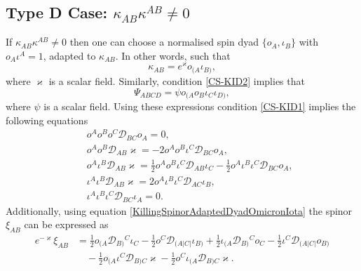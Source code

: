\documentclass[10pt,a4paper]{article}
\theoremstyle{plain}
\begin{document}
\subsection{Type D Case: $\kappa_{AB}\kappa^{AB}\neq 0$}
\label{TypeD}

If  $\kappa_{AB}\kappa^{AB}\neq 0$  then one can choose a normalised spin dyad $\{o_{A},\iota_{B}\}$
with $o_{A}\iota^{A}=1$, adapted to $\kappa_{AB}$. In other words, such that
\begin{equation} \label{KillingSpinorAdaptedDyadOmicronIota}
\kappa_{AB}=e^\varkappa o_{(A}\iota_{B)},
\end{equation}
where $\varkappa$ is a scalar field.
Similarly, condition \eqref{CS-KID2} implies that
\begin{equation}\label{WeylAdaptedDyadOmicronIota}
\Psi_{ABCD}=\psi o_{(A}o_{B}\iota_{C}\iota_{D)},
\end{equation}
where $\psi$ is a scalar field.  Using these expressions condition
\eqref{CS-KID1} implies the following equations
\begin{subequations}
\begin{eqnarray}
&& o^{A} o^{B} o^{C} \mathcal{D}_{BC}o_{A} = 0, \label{EqA1a} \\ &&
  o^{A} o^{B} \mathcal{D}_{AB}\varkappa = -2 o^{A} o^{B} \iota^{C}
  \mathcal{D}_{BC}o_{A}, \label{EqA1b} \\ && o^{A} \iota^{B}
  \mathcal{D}_{AB}\varkappa = \tfrac{1}{2} o^{A} o^{B} \iota^{C}
  \mathcal{D}_{AB}\iota_{C} - \tfrac{1}{2} o^{A} \iota^{B} \iota^{C}
  \mathcal{D}_{BC}o_{A} \label{EqA1c}, \\ && \iota^{A} \iota^{B}
  \mathcal{D}_{AB}\varkappa = 2 o^{A} \iota^{B} \iota^{C}
  \mathcal{D}_{AC}\iota_{B}, \label{EqA1dd} \\ && \iota^{A} \iota^{B}
  \iota^{C} \mathcal{D}_{BC}\iota_{A} = 0.  \label{EqA1d}
\end{eqnarray}
\end{subequations}
Additionally, using equation
\eqref{KillingSpinorAdaptedDyadOmicronIota} the spinor $\xi_{AB}$ can
be expressed as
\begin{align}\label{SpacespinorAuxiliaryVectorInDyadOmicronIota}
e^{-\varkappa}\xi_{AB} &= \tfrac{1}{2}
o_{(A}\mathcal{D}_{B)}{}^{C}\iota_{C} - \tfrac{1}{2}
o^{C}\mathcal{D}_{(A|C|}\iota_{B)} + \tfrac{1}{2}
\iota_{(A}\mathcal{D}_{B)}{}^{C}o_{C} - \tfrac{1}{2}
\iota^{C}\mathcal{D}_{(A|C|}o_{B)} \nonumber \\ &\quad - \tfrac{1}{2}
o_{(A}\iota^{C}\mathcal{D}_{B)C}\varkappa - \tfrac{1}{2}
o^{C}\iota_{(A}\mathcal{D}_{B)C}\varkappa.
\end{align}
\end{document}
